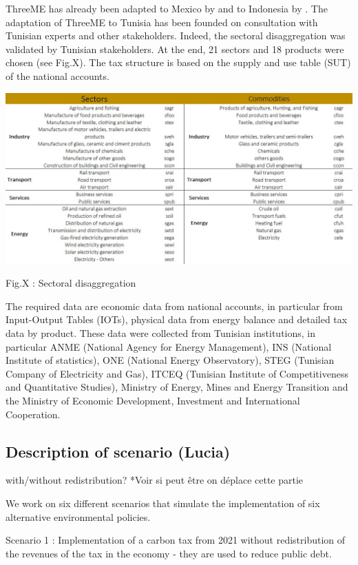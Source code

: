 \documentclass[
]{article}
\begin{document}
ThreeME has already been adapted to Mexico by \textcite{landarivera2016}
and to Indonesia by \textcite{reynes2017}. The adaptation of ThreeME to
Tunisia has been founded on consultation with Tunisian experts and other
stakeholders. Indeed, the sectoral disaggregation was validated by
Tunisian stakeholders. At the end, 21 sectors and 18 products were
chosen (see Fig.X). The tax structure is based on the supply and use
table (SUT) of the national accounts.

\includegraphics{Images/Sectoral disaggregation.jpg}

Fig.X : Sectoral disaggregation

The required data are economic data from national accounts, in
particular from Input-Output Tables (IOTs), physical data from energy
balance and detailed tax data by product. These data were collected from
Tunisian institutions, in particular ANME (National Agency for Energy
Management), INS (National Institute of statistics), ONE (National
Energy Observatory), STEG (Tunisian Company of Electricity and Gas),
ITCEQ (Tunisian Institute of Competitiveness and Quantitative Studies),
Ministry of Energy, Mines and Energy Transition and the Ministry of
Economic Development, Investment and International Cooperation.

\hypertarget{description-of-scenario-lucia}{%
\subsection{Description of scenario
(Lucia)}\label{description-of-scenario-lucia}}

with/without redistribution? *Voir si peut être on déplace cette partie

We work on six different scenarios that simulate the implementation of
six alternative environmental policies.

Scenario 1 : Implementation of a carbon tax from 2021 without
redistribution of the revenues of the tax in the economy - they are used
to reduce public debt.
\end{document}
